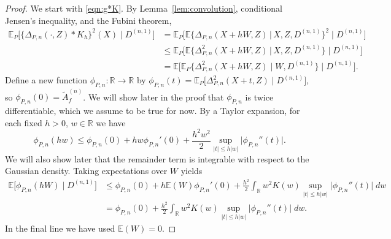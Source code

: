 \documentclass[aos]{imsart}
\newcommand{\R}{\mathbb{R}}
\newcommand{\E}{\mathbb{E}}
\newcommand{\given}{\,|\,}
\begin{document}
\begin{proof}
		We start with \eqref{eqn:g*K}. By Lemma~\ref{lem:convolution}, conditional Jensen's inequality, and the Fubini theorem,
		\begin{align*}
			\E_P\big[\{\Delta_{P,n}(\cdot,Z)*K_h\}^2(X)\;\big|\; D^{(n,1)}\big] &=\E_P\big[\E\{\Delta_{P,n}(X+hW,Z)\given  X,Z,D^{(n,1)}\}^2\;\big|\; D^{(n,1)}\big]\\
			&\leq \E_P\big[\E\big\{\Delta_{P,n}^2(X+hW,Z)\given  X,Z,D^{(n,1)}\big\}\;\big|\; D^{(n,1)}\big]\\
			&= \E\big[\E_P\big\{\Delta_{P,n}^2(X+hW,Z)\;\big|\; W, D^{(n,1)}\big\} \;\big|\; D^{(n,1)} \big].
		\end{align*}
		Define a new function $\phi_{P,n}:\R\to\R$ by $\phi_{P,n}(t) =  \E_P\big[\Delta_{P,n}^2(X+t,Z)\;\big|\; D^{(n,1)}\big]$, so $\phi_{P,n}(0)=\tilde{A}_f^{(n)}$. We will show later in the proof that $\phi_{P,n}$ is twice differentiable, which we
		assume to be true for now.
		By a Taylor expansion, for each fixed $h>0$, $w\in \R$ we have
		\begin{equation*}
			\phi_{P,n}(hw) \leq \phi_{P,n}(0)+hw \phi_{P,n}'(0) + \frac{h^2w^2}{2} \sup_{|t|\leq h|w|} \big|\phi_{P,n}''(t)\big|.
		\end{equation*}
		We will also show later that the remainder term is integrable with respect to the Gaussian density. Taking expectations over $W$ yields
		\begin{align}
			\E\big[\phi_{P,n}(hW)\;\big|\; D^{(n,1)}\big] &\leq \phi_{P,n}(0) + h\E(W) \phi_{P,n}'(0) + \frac{h^2}{2}\int_\R w^2K(w) \sup_{|t|\leq h|w|} \big|\phi_{P,n}''(t)\big| \; dw \nonumber\\
			&= \phi_{P,n}(0) + \frac{h^2}{2}\int_\R w^2K(w) \sup_{|t|\leq h|w|} \big|\phi_{P,n}''(t)\big| \; dw. \label{eqn:phihwtaylor}
		\end{align}
		In the final line we have used $\E(W)=0$.
		

\end{proof}
\end{document}
